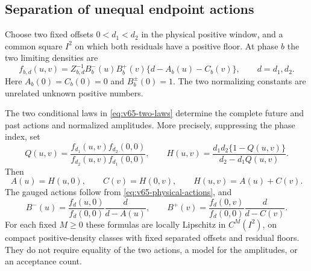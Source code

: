 \subsection{Separation of unequal endpoint actions}

Choose two fixed offsets $0<d_1<d_2$ in the physical positive window,
and a common square $I^2$ on which both residuals have a positive floor.
At phase $b$ the two limiting densities are
\begin{equation}\label{eq:v65-two-laws}
 f_{b,d}(u,v)=Z_{b,d}^{-1}B_b^-(u)B_b^+(v)
                       \{d-A_b(u)-C_b(v)\},\qquad d=d_1,d_2.
\end{equation}
Here $A_b(0)=C_b(0)=0$ and $B_b^\pm(0)=1$.
The two normalizing constants are unrelated unknown positive numbers.

\begin{proposition}\label{prop:v65-two-offset}
The two conditional laws in \eqref{eq:v65-two-laws} determine the
complete future and past actions and normalized amplitudes.  More
precisely, suppressing the phase index, set
\begin{equation}\label{eq:v65-offset-quotient}
 Q(u,v)=\frac{f_{d_1}(u,v)f_{d_2}(0,0)}
              {f_{d_2}(u,v)f_{d_1}(0,0)},\qquad
 H(u,v)=\frac{d_1d_2\{1-Q(u,v)\}}{d_2-d_1Q(u,v)}.
\end{equation}
Then
\begin{equation}\label{eq:v65-action-extraction}
 A(u)=H(u,0),\qquad C(v)=H(0,v),\qquad H(u,v)=A(u)+C(v).
\end{equation}
The gauged actions follow from \eqref{eq:v65-physical-actions}, and
\begin{equation}\label{eq:v65-amplitude-extraction}
 B^-(u)=\frac{f_d(u,0)}{f_d(0,0)}\frac{d}{d-A(u)},\qquad
 B^+(v)=\frac{f_d(0,v)}{f_d(0,0)}\frac{d}{d-C(v)}.
\end{equation}
For each fixed $M\ge0$ these formulas are locally Lipschitz in
$C^M(I^2)$, on compact positive-density classes with fixed separated
offsets and residual floors.  They do not require equality of the two
actions, a model for the amplitudes, or an acceptance count.
\end{proposition}
